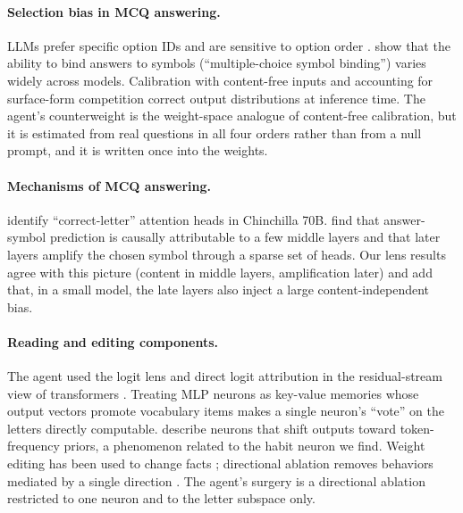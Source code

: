 \documentclass[11pt]{article}
\begin{document}
\paragraph{Selection bias in MCQ answering.} LLMs prefer specific option IDs \citep{zheng2024selectors} and are sensitive to option order \citep{pezeshkpour2024order}. \citet{robinson2023leveraging} show that the ability to bind answers to symbols (``multiple-choice symbol binding'') varies widely across models. Calibration with content-free inputs \citep{zhao2021calibrate} and accounting for surface-form competition \citep{holtzman2021surface} correct output distributions at inference time. The agent's counterweight is the weight-space analogue of content-free calibration, but it is estimated from real questions in all four orders rather than from a null prompt, and it is written once into the weights.

\paragraph{Mechanisms of MCQ answering.} \citet{lieberum2023circuit} identify ``correct-letter'' attention heads in Chinchilla 70B. \citet{wiegreffe2025answer} find that answer-symbol prediction is causally attributable to a few middle layers and that later layers amplify the chosen symbol through a sparse set of heads. Our lens results agree with this picture (content in middle layers, amplification later) and add that, in a small model, the late layers also inject a large content-independent bias.

\paragraph{Reading and editing components.} The agent used the logit lens \citep{nostalgebraist2020logitlens,belrose2023tuned} and direct logit attribution in the residual-stream view of transformers \citep{elhage2021framework}. Treating MLP neurons as key-value memories whose output vectors promote vocabulary items \citep{geva2021keyvalue,geva2022promoting} makes a single neuron's ``vote'' on the letters directly computable. \citet{stolfo2024confidence} describe neurons that shift outputs toward token-frequency priors, a phenomenon related to the habit neuron we find. Weight editing has been used to change facts \citep{meng2022rome,meng2023memit}; directional ablation removes behaviors mediated by a single direction \citep{arditi2024refusal}. The agent's surgery is a directional ablation restricted to one neuron and to the letter subspace only.
\end{document}
